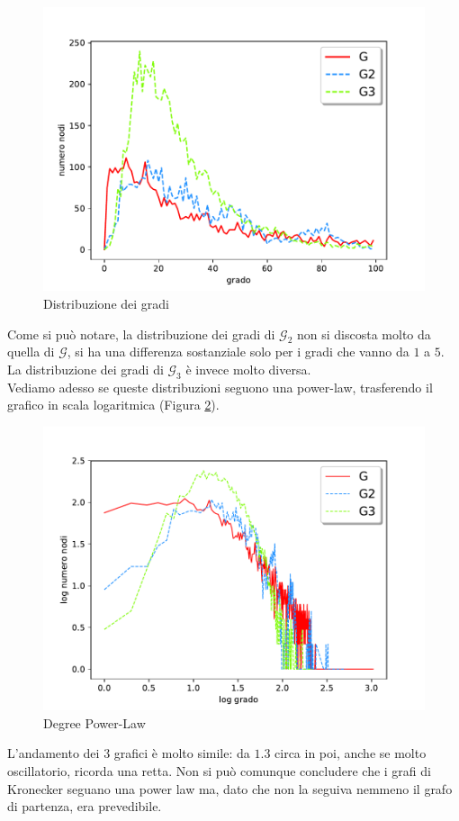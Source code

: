\documentclass[12pt]{scrartcl}
\begin{document}
\begin{figure}[H]
	\centering
	\includegraphics[width=0.7\linewidth]{imgs/Figure_1.pdf}
	\caption{Distribuzione dei gradi}\label{fig:fig1}
\end{figure}

Come si può notare, la distribuzione dei gradi di $\mathcal{G}_2$ non si discosta molto da quella di $\mathcal{G}$, si ha una differenza sostanziale solo per i gradi che vanno da $1$ a $5$. La distribuzione dei gradi di $\mathcal{G}_3$ è invece molto diversa.\\
Vediamo adesso se queste distribuzioni seguono una power-law, trasferendo il grafico in scala logaritmica (Figura \ref{fig:fig2}). 
\begin{figure}[H]
	\centering
	\includegraphics[width=0.7\linewidth]{imgs/Figure_2.pdf}
	\caption{Degree Power-Law}\label{fig:fig2}
\end{figure}

L'andamento dei $3$ grafici è molto simile: da $1.3$ circa in poi, anche se molto oscillatorio, ricorda una retta. Non si può comunque concludere che i grafi di Kronecker seguano una power law ma, dato che non la seguiva nemmeno il grafo di partenza, era prevedibile.\\
\end{document}
